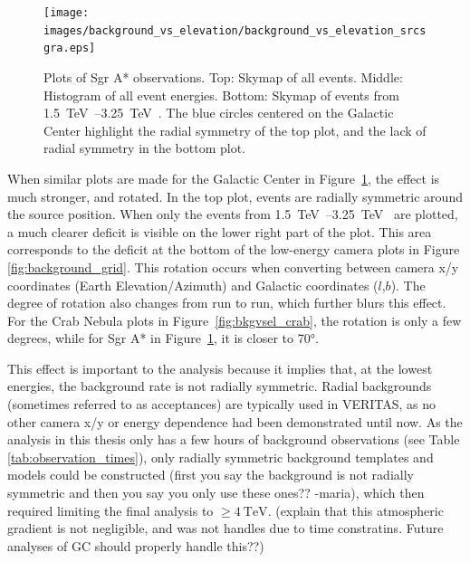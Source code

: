 {    \begin{figure}[!p]
      \centering
      \texttt{[image: images/background\_vs\_elevation/background\_vs\_elevation\_srcsgra.eps]}
      \caption[Background Vs Elevation Sgr A*]
      {\small 
        Plots of Sgr A* observations.
        Top: Skymap of all events.
        Middle: Histogram of all event energies.
        Bottom: Skymap of events from \SIrange{1.5}{3.25}{\TeV{}}.  
        The blue circles centered on the Galactic Center highlight the radial symmetry of the top plot, and the lack of radial symmetry in the bottom plot.
      }
      \label{fig:bkgvsel_sgra}
    \end{figure}
    
    When similar plots are made for the Galactic Center in Figure~\ref{fig:bkgvsel_sgra}, the effect is much stronger, and rotated.
    In the top plot, events are radially symmetric around the source position.
    When only the events from \SIrange{1.5}{3.25}{\TeV{}} are plotted, a much clearer deficit is visible on the lower right part of the plot.
    This area corresponds to the deficit at the bottom of the low-energy camera plots in Figure \ref{fig:background_grid}.
    This rotation occurs when converting between camera x/y coordinates (Earth Elevation/Azimuth) and Galactic coordinates ($l$,$b$).
    The degree of rotation also changes from run to run, which further blurs this effect.
    For the Crab Nebula plots in Figure~\ref{fig:bkgvsel_crab}, the rotation is only a few degrees, while for Sgr A* in Figure~\ref{fig:bkgvsel_sgra}, it is closer to \ang{70}.
    
    This effect is important to the analysis because it implies that, at the lowest energies, the background rate is not radially symmetric.
    Radial backgrounds (sometimes referred to as acceptances) are typically used in VERITAS, as no other camera x/y or energy dependence had been demonstrated until now.
    As the analysis in this thesis only has a few hours of background observations (see Table \ref{tab:observation_times}), {\color{red}only radially symmetric background templates and models could be constructed (first you say the background is not radially symmetric and then you say you only use these ones?? -maria)}, which then required limiting the final analysis to $\geq\SI{4}{\TeV{}}$.
    {\color{red}(explain that this atmospheric gradient is not negligible, and was not handles due to time constratins.  Future analyses of GC should properly handle this??)}
    
    \FloatBarrier

}
